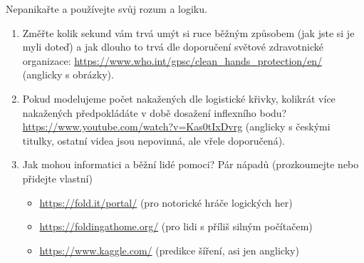 Nepanikařte a používejte svůj rozum a logiku.

\begin{enumerate}

	\item  Změřte kolik sekund vám trvá umýt si ruce běžným způsobem (jak jste si je myli doteď) a jak dlouho to trvá dle doporučení světové zdravotnické organizace:
		\url{https://www.who.int/gpsc/clean_hands_protection/en/} (anglicky s obrázky).

	\item  Pokud modelujeme počet nakažených dle logistické křivky, kolikrát více nakažených předpokládáte v době dosažení inflexního bodu?
		\url{https://www.youtube.com/watch?v=Kas0tIxDvrg} (anglicky s českými titulky, ostatní videa jsou nepovinná, ale vřele doporučená).

	\item  Jak mohou informatici a běžní lidé pomoci?
		Pár nápadů (prozkoumejte nebo přidejte vlastní)
		\begin{itemize}
			\item  \url{https://fold.it/portal/} (pro notorické hráče logických her)
			\item  \url{https://foldingathome.org/} (pro lidi s příliš silným počítačem)
			\item  \url{https://www.kaggle.com/} (predikce šíření, asi jen anglicky)
		\end{itemize}

\end{enumerate}

